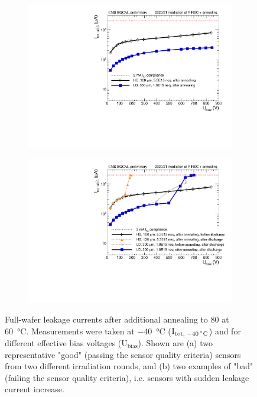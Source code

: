 \begin{figure}
	\captionsetup[subfigure]{aboveskip=-1pt,belowskip=-1pt}
	\centering
	\begin{subfigure}[b]{0.49\textwidth}
		\includegraphics[width=0.999\textwidth]{plots/total_iv/total_current_IV.pdf}
		\subcaption{
		}
		\label{plot:tot_IV_good}
	\end{subfigure}
	\hfill
	\begin{subfigure}[b]{0.49\textwidth}
		\includegraphics[width=0.999\textwidth]{plots/total_iv/total_current_IV_bad.pdf}
		\subcaption{
		}
		\label{plot:tot_IV_bad}
	\end{subfigure}
	\caption{
		Full-wafer leakage currents after additional annealing to \SI{80}{\min} at \SI{60}{\celsius}. Measurements were taken at \SI{-40}{\celsius} ($\text{I}_\text{tot, \SI{-40}{\celsius}}$) and for different effective bias voltages ($\text{U}_\text{bias}$). 
		Shown are (a) two representative "good" (passing the sensor quality criteria) sensors from two different irradiation rounds, and (b) two examples of "bad" (failing the sensor quality criteria), i.e. sensors with sudden leakage current increase.
	}
\end{figure}



